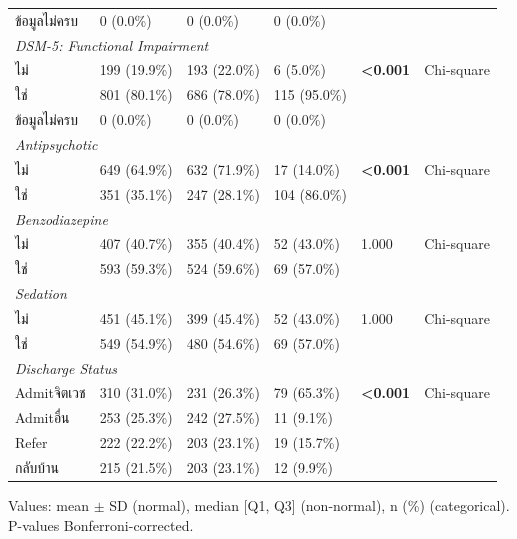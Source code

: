\begin{table}[htbp]
\begin{tabular}{llllll}
\quad ข้อมูลไม่ครบ & 0 (0.0\%) & 0 (0.0\%) & 0 (0.0\%) &  &  \\
\multicolumn{6}{l}{\textit{DSM-5: Functional Impairment}} \\
\quad ไม่ & 199 (19.9\%) & 193 (22.0\%) & 6 (5.0\%) & \textbf{<0.001} & Chi-square \\
\quad ใช่ & 801 (80.1\%) & 686 (78.0\%) & 115 (95.0\%) &  &  \\
\quad ข้อมูลไม่ครบ & 0 (0.0\%) & 0 (0.0\%) & 0 (0.0\%) &  &  \\
\multicolumn{6}{l}{\textit{Antipsychotic}} \\
\quad ไม่ & 649 (64.9\%) & 632 (71.9\%) & 17 (14.0\%) & \textbf{<0.001} & Chi-square \\
\quad ใช่ & 351 (35.1\%) & 247 (28.1\%) & 104 (86.0\%) &  &  \\
\multicolumn{6}{l}{\textit{Benzodiazepine}} \\
\quad ไม่ & 407 (40.7\%) & 355 (40.4\%) & 52 (43.0\%) & 1.000 & Chi-square \\
\quad ใช่ & 593 (59.3\%) & 524 (59.6\%) & 69 (57.0\%) &  &  \\
\multicolumn{6}{l}{\textit{Sedation}} \\
\quad ไม่ & 451 (45.1\%) & 399 (45.4\%) & 52 (43.0\%) & 1.000 & Chi-square \\
\quad ใช่ & 549 (54.9\%) & 480 (54.6\%) & 69 (57.0\%) &  &  \\
\multicolumn{6}{l}{\textit{Discharge Status}} \\
\quad Admitจิตเวช & 310 (31.0\%) & 231 (26.3\%) & 79 (65.3\%) & \textbf{<0.001} & Chi-square \\
\quad Admitอื่น & 253 (25.3\%) & 242 (27.5\%) & 11 (9.1\%) &  &  \\
\quad Refer & 222 (22.2\%) & 203 (23.1\%) & 19 (15.7\%) &  &  \\
\quad กลับบ้าน & 215 (21.5\%) & 203 (23.1\%) & 12 (9.9\%) &  &  \\
\bottomrule
\end{tabular}
\begin{flushleft}
\small
Values: mean $\pm$ SD (normal), median [Q1, Q3] (non-normal), n (\%) (categorical). P-values Bonferroni-corrected.
\end{flushleft}
\end{table}